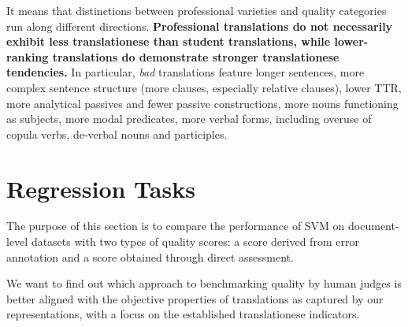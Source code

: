 \label{pg:bad_tendencies}
It means that distinctions between professional varieties and quality categories run along different directions. \textbf{Professional translations do not necessarily exhibit less translationese than student translations, while lower-ranking translations do demonstrate stronger translationese tendencies.} In particular, \textit{bad} translations feature longer sentences, more complex sentence structure (more clauses, especially relative clauses), lower TTR, more analytical passives and fewer passive constructions, more nouns functioning as subjects, more modal predicates, more verbal forms, including overuse of copula verbs, de-verbal nouns and participles. 



\section{\label{sec:_scores}Regression Tasks}
The purpose of this section is to compare the performance of SVM on document-level datasets with two types of quality scores: a score derived from error annotation and a score obtained through direct assessment.

We want to find out which approach to benchmarking quality by human judges is better aligned with the objective properties of translations as captured by our representations, with a focus on the established translationese indicators.

